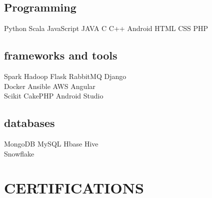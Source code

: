 \documentclass[]{deedy-resume-openfont}
\begin{document}
\begin{minipage}[t]{0.33\textwidth}
\subsection{Programming}
Python \textbullet{} Scala \textbullet{} JavaScript \textbullet{} JAVA \textbullet{} C \textbullet{} C++ \textbullet{} Android \textbullet{} HTML \textbullet{} CSS \textbullet{} PHP \\
\sectionsep

\subsection{frameworks and tools}

Spark \textbullet{} Hadoop \textbullet{}
Flask \textbullet{} RabbitMQ \textbullet{} Django \textbullet{} \\ Docker \textbullet{} Ansible  \textbullet{} AWS \textbullet{} Angular \textbullet{} \\ Scikit \textbullet{} CakePHP
\textbullet{} Android Studio
\sectionsep

\subsection{databases}
MongoDB \textbullet{} MySQL \textbullet{} Hbase \textbullet{} Hive \\ \textbullet{} Snowflake
\sectionsep


\section{CERTIFICATIONS}

\vspace{1mm}
\vspace{1mm}
\vspace{1mm}
\vspace{1mm}

%
%

\end{minipage}
\hfill
\end{document}
